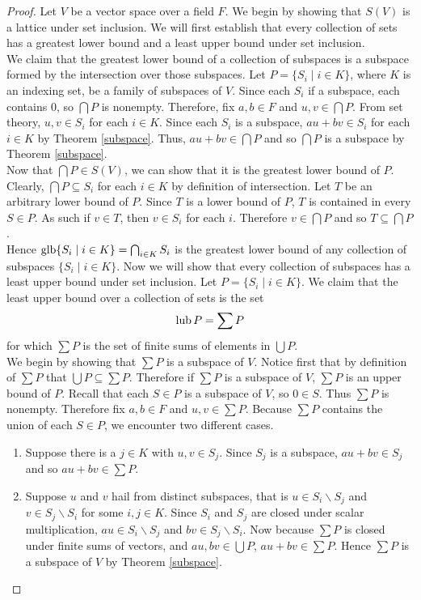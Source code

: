 \begin{proof}
Let $V$ be a vector space over a field $F$. We begin by showing that $S(V)$ is a lattice under set inclusion. We will first establish that every collection of sets has a greatest lower bound and a least upper bound under set inclusion.\\

We claim that the greatest lower bound of a collection of subspaces is a subspace formed by the intersection over those subspaces. Let $P=\{S_i\mid i\in K\}$, where $K$ is an indexing set, be a family of subspaces of $V$. Since each $S_i$ if a subspace, each contains 0, so $\bigcap P$ is nonempty. Therefore, fix $a,b\in F$ and $u,v\in\bigcap P$. From set theory, $u,v\in S_i$ for each $i\in K$. Since each $S_i$ is a subspace, $au+bv\in S_i$ for each $i\in K$ by Theorem \ref{subspace}. Thus, $au+bv\in\bigcap P$ and so $\bigcap P$ is a subspace by Theorem \ref{subspace}.\\

Now that $\bigcap P\in S(V)$, we can show that it is the greatest lower bound of $P$. Clearly, $\bigcap P\subseteq S_i$ for each $i\in K$ by definition of intersection. Let $T$ be an arbitrary lower bound of $P$. Since $T$ is a lower bound of $P$, $T$ is contained in every $S\in P$. As such if $v\in T$, then $v\in S_i$ for each $i$. Therefore $v\in\bigcap P$ and so $T\subseteq\bigcap P$.\\

Hence $\operatorname{glb}\{S_i\mid i\in K\}=\bigcap_{i\in K} S_i$ is the greatest lower bound of any collection of subspaces $\{S_i\mid i\in K\}$. Now we will show that every collection of subspaces has a least upper bound under set inclusion. Let $P=\{S_i\mid i\in K\}$. We claim that the least upper bound over a collection of sets is the set
\[
	\operatorname{lub} P = \sum P 
\]
for which $\sum P$ is the set of finite sums of elements in $\bigcup P$.\\

We begin by showing that $\sum P$ is a subspace of $V$. Notice first that by definition of $\sum P$ that $\bigcup P\subseteq\sum P$. Therefore if $\sum P$ is a subspace of $V$, $\sum P$ is an upper bound of $P$. Recall that each $S\in P$ is a subspace of $V$, so $0\in S$. Thus $\sum P$ is nonempty. Therefore fix $a,b\in F$ and $u,v\in\sum P$. Because $\sum P$ contains the union of each $S\in P$, we encounter two different cases.
\begin{enumerate}[label=\textit{Case \arabic*:}]
\item Suppose there is a $j\in K$ with $u,v\in S_j$. Since $S_j$ is a subspace, $au+bv\in S_j$ and so $au+bv\in\sum P$. 
\item Suppose $u$ and $v$ hail from distinct subspaces, that is $u\in S_i\backslash S_j$ and $v\in S_j\backslash S_i$ for some $i,j\in K$. Since $S_i$ and $S_j$ are closed under scalar multiplication, $au\in S_i\backslash S_j$ and $bv\in S_j\backslash S_i$. Now because $\sum P$ is closed under finite sums of vectors, and $au,bv\in\bigcup P$, $au+bv\in\sum P$. Hence $\sum P$ is a subspace of $V$ by Theorem \ref{subspace}.
\end{enumerate}


\end{proof}
